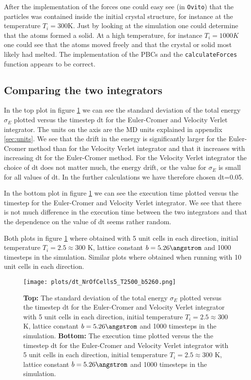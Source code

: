 \documentclass[11pt,a4wide]{article}
\begin{document}
After the implementation of the forces one could easy see (in \texttt{Ovito}) that the particles was contained inside the initial crystal structure, for instance at the temperature $T_i =300$K. Just by looking at the simulation one could determine that the atoms formed a solid. At a high temperature, for instance $T_i = 1000K$ one could see that the atoms moved freely and that the crystal or solid most likely had melted. The implementation of the PBCs and the \texttt{calculateForces} function appears to be correct.

\subsection{Comparing the two integrators} \label{sec: integrators_results}

In the top plot in figure \ref{fig: dt} we can see the standard deviation of the total energy $\sigma_E$ plotted versus the timestep dt for the Euler-Cromer and Velocity Verlet integrator. The units on the axis are the MD units explained in appendix \ref{sec:units}. We see that the drift in the energy is significantly larger for the Euler-Cromer method than for the Velocity Verlet integrator and that it increases with increasing dt for the Euler-Cromer method. For the Velocity Verlet integrator the choice of dt does not matter much, the energy drift, or the value for $\sigma_E$ is small for all values of dt. In the further calculations we have therefore chosen dt=0.05.  

In the bottom plot in figure \ref{fig: dt} we can see the execution time plotted versus the timestep for the Euler-Cromer and Velocity Verlet integrator. We see that there is not much difference in the execution time between the two integrators and that the dependence on the value of dt seems rather random. 

Both plots in figure \ref{fig: dt} where obtained with 5 unit cells in each direction, initial temperature $T_i = 2.5 \approx 300$ K, lattice constant $b=5.26 \angstrom$ and 1000 timesteps in the simulation. Similar plots where obtained when running with 10 unit cells in each direction. 

\begin{figure}[htp]
\centering
\texttt{[image: plots/dt\_NrOfCells5\_T2500\_b5260.png]}
\caption{\textbf{Top:} The standard deviation of the total energy $\sigma_E$ plotted versus the timestep dt for the Euler-Cromer and Velocity Verlet integrator with 5 unit cells in each direction, initial temperature $T_i = 2.5 \approx 300$ K, lattice constant $b=5.26 \angstrom$ and 1000 timesteps in the simulation. \textbf{Bottom:} The execution time plotted versus the the timestep dt for the Euler-Cromer and Velocity Verlet integrator with 5 unit cells in each direction, initial temperature $T_i = 2.5 \approx 300$ K, lattice constant $b=5.26 \angstrom$ and 1000 timesteps in the simulation.}
\label{fig: dt}
\end{figure}
\end{document}
